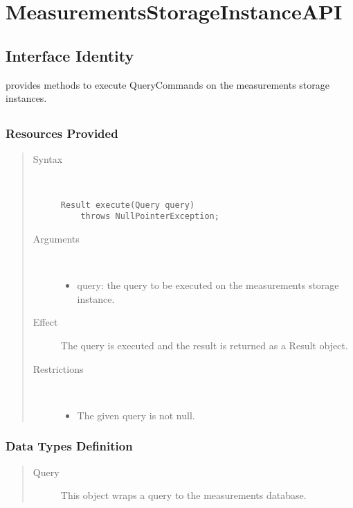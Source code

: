 \section{MeasurementsStorageInstanceAPI}
\label{api:measurements-storage-instance-api}

\subsection{Interface Identity}

\npar {} provides methods to execute
QueryCommands on the measurements storage instances.

\subsection{}

\subsubsection{Resources Provided}

\begin{quote}
	\begin{description}
		\item[Syntax] \ 
		\begin{verbatim}
Result execute(Query query) 
    throws NullPointerException;
		\end{verbatim}
		\item[Arguments] \
		\begin{itemize}
			\item query: the query to be executed on the measurements storage instance. 
		\end{itemize}
		\item[Effect] The query is executed and the result is returned as a Result
		object.
		\item[Restrictions] \ 
		\begin{itemize}
			\item The given query is not null.
		\end{itemize}
	\end{description} 
\end{quote}

\subsubsection{Data Types Definition}

\begin{quote}
	\begin{description}
		\item[Query] This object wraps a query to the measurements database.
	\end{description} 
\end{quote}

